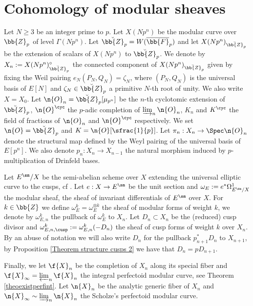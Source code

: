 \section{Cohomology of modular sheaves}
\label{COhomology of modular sheaves}

Let $N\geq 3$ be an integer prime to $p$. Let $X(Np^n)$ be the modular curve over~$\bb{Z}_p$ of level $\Gamma(Np^n)$. Let $\breve{\bb{Z}}_p=W(\overline{\bb{F}}_p)$ and let $X(Np^n)_{\breve{\bb{Z}}_p}$ be the extension of scalars of $X(Np^n)$ to $\breve{\bb{Z}}_p$. We denote by $X_n:=X(Np^n)^{\circ}_{\breve{\bb{Z}}_p}$ the connected component of $X(Np^n)_{\breve{\bb{Z}}_p}$ given by fixing the Weil pairing $e_{N}(P_N,Q_N)=\zeta_{N}$, where $(P_N,Q_N)$ is the universal basis of $E[N]$ and $\zeta_N\in \breve{\bb{Z}}_p$ a primitive $N$-th root of unity. We also write $X=X_0$. Let $\n{O}_n= \breve{\bb{Z}}_p[\mu_{p^n}]$ be the $n$-th cyclotomic extension of $\breve{\bb{Z}}_p$, $\n{O}^{\cyc}$ the $p$-adic completion of $\varinjlim_{n} \n{O}_n$, $K_n$ and $K^{\cyc}$ the field of fractions of $\n{O}_n$ and $\n{O}^{\cyc}$ respectively. We set $\n{O}=\breve{\bb{Z}}_p$ and $K=\n{O}[\sfrac{1}{p}]$. Let $\pi_n : X_n\to \Spec \n{O}_n$ denote the structural map defined by the Weyl pairing of the universal basis of $E[p^n]$. We also denote $p_n: X_n\to X_{n-1}$ the natural morphism induced by $p$-multiplication of Drinfeld bases.

Let $E^{\sm}/X$ be the semi-abelian scheme over $X$ extending the universal elliptic curve to the cusps, cf \cite{deligne1973schemas}. Let $e:X\to E^{\sm}$ be the unit section and $\omega_E:=e^* \Omega^1_{E^{\sm}/X}$ the modular sheaf, \ie the sheaf of invariant differentials of $E^{\sm}$ over $X$. For $k\in \bb{Z}$ we define $\omega_E^{k}= \omega_E^{\otimes k}$ the sheaf of modular forms of weight $k$, we denote by $\omega^k_{E,n}$ the pullback of $\omega_E^k$ to $X_n$. Let $D_n\subset X_n$ be the (reduced) cusp divisor and $\omega_{E,n,\cusp}^k:=\omega_{E,n}^k(-D_n)$ the sheaf of cusp forms of weight $k$ over $X_n$. By an abuse of notation we will also write $D_n$ for the pullback $p_{n+1}^* D_n$ to $X_{n+1}$, by Proposition \ref{Theorem structure cusps 2} we have that $D_{n}=p D_{n+1}$.

Finally, we let $\f{X}_n$ be the completion of $X_n$ along its special fiber and $\f{X}_{\infty}=\varprojlim_{n} \f{X}_n$ the integral perfectoid modular curve, see Theorem \ref{theoexistperfint}. Let $\n{X}_n$ be the analytic generic fiber of $X_n$ and $\n{X}_{\infty}\sim \varinjlim_n \n{X}_n$ the Scholze's perfectoid modular curve.

